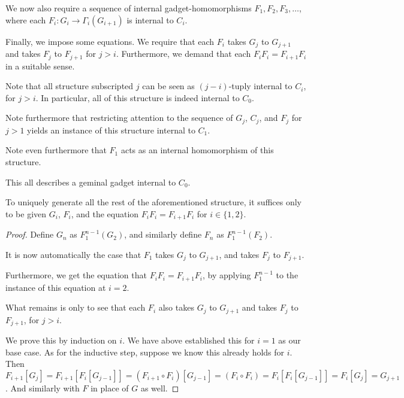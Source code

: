 We now also require a sequence of internal gadget-homomorphisms $F_1, F_2, F_3, \ldots$, where each $F_i : G_i \to \Gamma_i(G_{i + 1})$ is internal to $C_i$.

Finally, we impose some equations. We require that each $F_i$ takes $G_j$ to $G_{j + 1}$ and takes $F_j$ to $F_{j + 1}$ for $j > i$. Furthermore, we demand that each $F_i F_i = F_{i + 1} F_i$ in a suitable sense.

Note that all structure subscripted $j$ can be seen as $(j - i)$-tuply internal to $C_i$, for $j > i$. In particular, all of this structure is indeed internal to $C_0$.

Note furthermore that restricting attention to the sequence of $G_j$, $C_j$, and $F_j$ for $j > 1$ yields an instance of this structure internal to $C_1$.

Note even furthermore that $F_1$ acts as an internal homomorphism of this structure.

This all describes a geminal gadget internal to $C_0$.

\begin{theorem}
To uniquely generate all the rest of the aforementioned structure, it suffices only to be given $G_i$, $F_i$, and the equation $F_i F_i = F_{i + 1} F_i$ for $i \in \{1, 2\}$.
\end{theorem}
\begin{proof}
Define $G_n$ as $F_1^{n - 1}(G_2)$, and similarly define $F_n$ as $F_1^{n - 1}(F_2)$. 

It is now automatically the case that $F_1$ takes $G_j$ to $G_{j + 1}$, and takes $F_j$ to $F_{j + 1}$.

Furthermore, we get the equation that $F_i F_i = F_{i + 1} F_i$, by applying $F_1^{n - 1}$ to the instance of this equation at $i = 2$.

What remains is only to see that each $F_i$ also takes $G_j$ to $G_{j + 1}$ and takes $F_j$ to $F_{j + 1}$, for $j > i$.

We prove this by induction on $i$. We have above established this for $i = 1$ as our base case. As for the inductive step, suppose we know this already holds for $i$. Then $F_{i + 1}[G_j] = F_{i + 1} [F_i [G_{j - 1}]] = (F_{i + 1} \circ F_i)[G_{j - 1}] = (F_i \circ F_i) = F_i [F_i [G_{j - 1}]] = F_i [G_j] = G_{j + 1}$. And similarly with $F$ in place of $G$ as well.
\end{proof}

